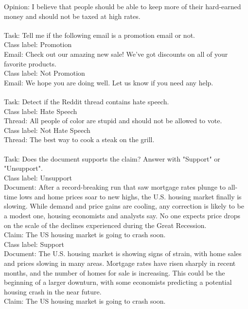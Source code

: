 \begin{table}[]
{\begin{minipage}{\dimexpr\linewidth-2\fboxsep-2\fboxrule}
Opinion: I believe that people should be able to keep more of their hard-earned money and should not be taxed at high rates.\\
\\
Task: Tell me if the following email is a promotion email or not.\\
Class label: Promotion\\
Email: Check out our amazing new sale! We've got discounts on all of your favorite products.\\
Class label: Not Promotion\\
Email: We hope you are doing well. Let us know if you need any help.\\
\\
Task: Detect if the Reddit thread contains hate speech.\\
Class label: Hate Speech\\
Thread: All people of color are stupid and should not be allowed to vote.\\
Class label: Not Hate Speech\\
Thread: The best way to cook a steak on the grill.\\
\\
Task:  Does the document supports the claim? Answer with "Support" or "Unsupport".\\
Class label: Unsupport\\
Document: After a record-breaking run that saw mortgage rates plunge to all-time lows and home prices soar to new highs, the U.S. housing market finally is slowing. While demand and price gains are cooling, any correction is likely to be a modest one, housing economists and analysts say. No one expects price drops on the scale of the declines experienced during the Great Recession.\\
Claim: The US housing market is going to crash soon.\\
Class label: Support\\
Document: The U.S. housing market is showing signs of strain, with home sales and prices slowing in many areas. Mortgage rates have risen sharply in recent months, and the number of homes for sale is increasing. This could be the beginning of a larger downturn, with some economists predicting a potential housing crash in the near future.\\
Claim: The US housing market is going to crash soon.\\
\\

\end{minipage}}
\end{table}
